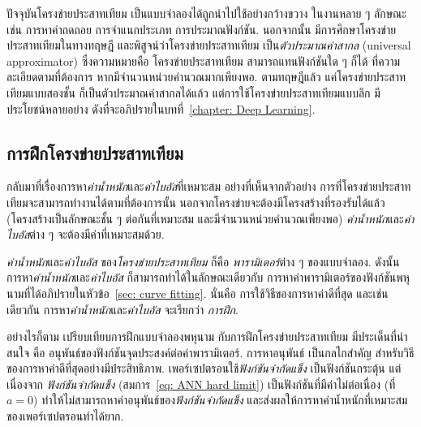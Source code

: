 %
ปัจจุบันโครงข่ายประสาทเทียม
เป็นแบบจำลองได้ถูกนำไปใช้อย่างกว้างขวาง ในงานหลาย ๆ ลักษณะ เช่น การหาค่าถดถอย การจำแนกประเภท การประมาณฟังก์ชัน. 
%
นอกจากนั้น มีการศึกษาโครงข่ายประสาทเทียมในทางทฤษฎี และพิสูจน์ว่าโครงข่ายประสาทเทียม
เป็น\textit{ตัวประมาณค่าสากล} (universal approximator)\cite{Cybenko1989a, Hornik1991a}
ซึ่งความหมายคือ 
โครงข่ายประสาทเทียม
สามารถแทนฟังก์ชันใด ๆ ก็ได้ ที่ความละเอียดตามที่ต้องการ หากมีจำนวนหน่วยคำนวณมากเพียงพอ.
ตามทฤษฎีแล้ว แค่โครงข่ายประสาทเทียมแบบสองชั้น
ก็เป็นตัวประมาณค่าสากลได้แล้ว
แต่การใช้โครงข่ายประสาทเทียมแบบลึก
มีประโยชน์หลายอย่าง
ดังที่จะอภิปรายในบทที่~\ref{chapter: Deep Learning}.
%
%



\subsection{การฝึกโครงข่ายประสาทเทียม}
\label{sec: ann training}

กลับมาที่เรื่องการหา\textit{ค่าน้ำหนัก}และ\textit{ค่าไบอัส}ที่เหมาะสม
อย่างที่เห็นจากตัวอย่าง การที่โครงข่ายประสาทเทียมจะสามารถทำงานได้ตามที่ต้องการนั้น 
นอกจากโครงข่ายจะต้องมีโครงสร้างที่รองรับได้แล้ว
(โครงสร้างเป็นลักษณะชั้น ๆ ต่อกันที่เหมาะสม และมีจำนวนหน่วยคำนวณเพียงพอ) 
\textit{ค่าน้ำหนัก}และ\textit{ค่าไบอัส}ต่าง ๆ
จะต้องมีค่าที่เหมาะสมด้วย.

\textit{ค่าน้ำหนัก}และ\textit{ค่าไบอัส}
ของ\textit{โครงข่ายประสาทเทียม}
ก็คือ \textit{พารามิเตอร์}ต่าง ๆ ของแบบจำลอง.
ดังนั้น 
การหา\textit{ค่าน้ำหนัก}และ\textit{ค่าไบอัส}
ก็สามารถทำได้ในลักษณะเดียวกับ การหาค่าพารามิเตอร์ของฟังก์ชันพหุนามที่ได้อภิปรายในหัวข้อ~\ref{sec: curve fitting}.
นั่นคือ
การใช้วิธีของการหาค่าดีที่สุด
และเช่นเดียวกัน
การหา\textit{ค่าน้ำหนัก}และ\textit{ค่าไบอัส}
จะเรียกว่า \textit{การฝึก}.

อย่างไรก็ตาม 
เปรียบเทียบการฝึกแบบจำลองพหุนาม
กับการฝึกโครงข่ายประสาทเทียม
มีประเด็นที่น่าสนใจ คือ
อนุพันธ์ของฟังก์ชันจุดประสงค์ต่อค่าพารามิเตอร์.
การหาอนุพันธ์
เป็นกลไกสำคัญ
สำหรับวิธีของการหาค่าดีที่สุดอย่างมีประสิทธิภาพ.
เพอร์เซปตรอนใช้\textit{ฟังก์ชันจำกัดแข็ง}
เป็นฟังก์ชันกระตุ้น
แต่เนื่องจาก \textit{ฟังก์ชันจำกัดแข็ง} (สมการ~\ref{eq: ANN hard limit}) เป็นฟังก์ชันที่มีค่าไม่ต่อเนื่อง (ที่ $a = 0$) 
ทำให้ไม่สามารถหาค่าอนุพันธ์ของ\textit{ฟังก์ชันจำกัดแข็ง}
และส่งผลให้การหาค่าน้ำหนักที่เหมาะสมของเพอร์เซปตรอนทำได้ยาก.

